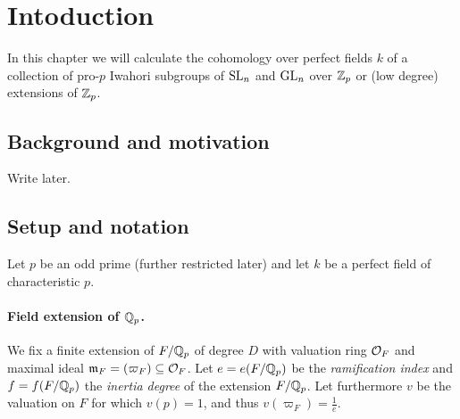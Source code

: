 \section{Intoduction}%
\label{sec:cohiwagps-intro}

In this chapter we will calculate the cohomology over perfect fields $k$ of a collection of pro-$p$ Iwahori subgroups of $\operatorname{SL}_{n}$ and $\operatorname{GL}_{n}$ over $\mathbb{Z}_{p}$ or (low degree) extensions of $\mathbb{Z}_{p}$.

\subsection{Background and motivation}%
\label{subsec:background-iwa}

Write later.

\subsection{Setup and notation}%
\label{subsec:setup-iwa}

Let $p$ be an odd prime (further restricted later) and let $k$ be a perfect field of characteristic $p$.

\paragraph{Field extension of $\mathbb{Q}_{p}$.} We fix a finite extension of $F/\mathbb{Q}_{p}$ of degree $D$ with valuation ring $\mathcal{O}_{F}$ and maximal ideal $\mathfrak{m}_{F} = (\varpi_{F}) \subseteq \mathcal{O}_{F}$. Let $e = e(F/\mathbb{Q}_{p})$ be the \emph{ramification index} and $f = f(F/\mathbb{Q}_{p})$ the \emph{inertia degree} of the extension $F/\mathbb{Q}_{p}$. Let furthermore $v$ be the valuation on $F$ for which $v(p) = 1$, and thus $v(\varpi_{F}) = \frac{1}{e}$.

